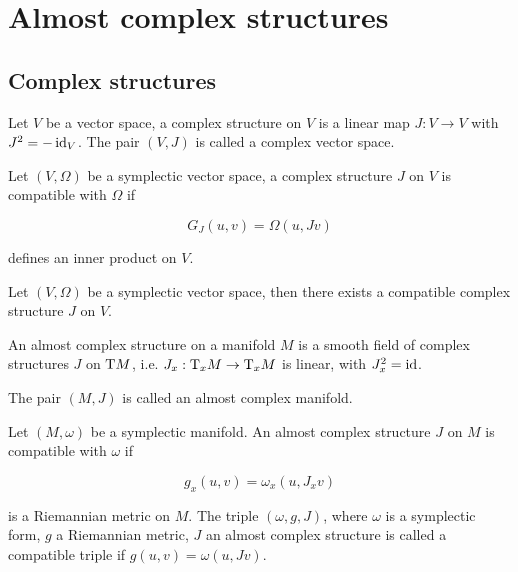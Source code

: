 \section{Almost complex structures}

\subsection{Complex structures}

\begin{definition}
     Let \(V\) be a vector space, a complex structure on \(V\) is a linear map \(J : V \to V\) with \(J^2 = -\operatorname{id}_V\). The pair \((V, J)\) is called a complex vector space.
\end{definition}

\begin{definition}
    [compatible] Let \((V, \Omega)\) be a symplectic vector space, a complex structure \(J\) on \(V\) is compatible with \(\Omega\) if

    \[G_J(u, v) = \Omega(u, Jv)\]

    defines an inner product on \(V\).
\end{definition}

\begin{proposition}
    Let \((V, \Omega)\) be a symplectic vector space, then there exists a compatible complex structure \(J\) on \(V\).
\end{proposition}

\begin{definition}
     An almost complex structure on a manifold \(M\) is a smooth field of complex structures \(J\) on \(\mathrm{T} M\), i.e. \(J_x : \mathrm{T}_x M \to \mathrm{T}_x M\) is linear, with \(J_x^2 = \operatorname{id}\).

    The pair \((M, J)\) is called an almost complex manifold.
\end{definition}

\begin{definition}
    [compatible] Let \((M, \omega)\) be a symplectic manifold. An almost complex structure \(J\) on \(M\) is compatible with \(\omega\) if

    \[g_x(u, v) = \omega_x(u, J_xv)\]

    is a Riemannian metric on \(M\). The triple \((\omega, g, J)\), where \(\omega\) is a symplectic form, \(g\) a Riemannian metric, \(J\) an almost complex structure is called a compatible triple if \(g(u, v) = \omega(u, Jv)\).
\end{definition}

